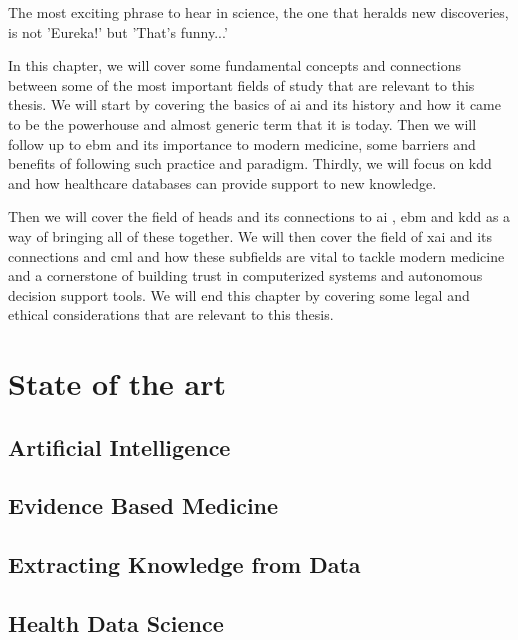 \begin{savequote}[75mm]
The most exciting phrase to hear in science, the one that heralds new discoveries, is not 'Eureka!' but 'That's funny...'
\end{savequote}

In this chapter, we will cover some fundamental concepts and connections between some of the most important fields of study that are relevant to this thesis. We will start by covering the basics of \ac{ai} and its history and how it came to be the powerhouse and almost generic term that it is today. Then we will follow up to \ac{ebm} and its importance to modern medicine, some barriers and benefits of following such practice and paradigm. Thirdly, we will focus on \ac{kdd} and how healthcare databases can provide support to new knowledge.

Then we will cover the field of \ac{heads} and its connections to \ac{ai} , \ac{ebm} and \ac{kdd} as a way of bringing all of these together. We will then cover the field of \ac{xai} and its connections and \ac{cml} and how these subfields are vital to tackle modern medicine and a cornerstone of building trust in computerized systems and autonomous decision support tools. We will end this chapter by covering some legal and ethical considerations that are relevant to this thesis.

\chapter{State of the art} \label{chap:sota}


\section{Artificial Intelligence}


\section{Evidence Based Medicine}\label{subsec:ebm}




\section{Extracting Knowledge from Data}\label{sec:kdd}



\section{Health Data Science}

